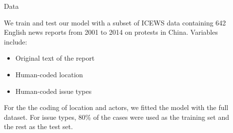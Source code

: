 \documentclass[final]{beamer}
\newlength{\sepwid}
\newlength{\onecolwid}
\newlength{\twocolwid}
\newlength{\threecolwid}
\begin{document}
\begin{frame}[t]
\begin{columns}[t]
\begin{column}{\threecolwid} %

\begin{columns}[t,totalwidth=\twocolwid] %

\begin{column}{\onecolwid}\vspace{-.6in} %


\begin{block}{Data}

We train and test our model with a subset of ICEWS data containing 642 English news reports from 2001 to 2014 on protests in China. Variables include:

\begin{itemize}
\item Original text of the report
\item Human-coded location
\item Human-coded issue types
\end{itemize}

For the the coding of location and actors, we fitted the model with the full dataset. For issue types, 80\% of the cases were used as the training set and the rest as the test set.

\end{block}


\end{column} %

\begin{column}{\sepwid}\end{column} %

\begin{column}{\twocolwid}\vspace{-.6in} %



\end{column}
\end{columns}
\end{column}
\end{columns}
\end{frame}
\end{document}

